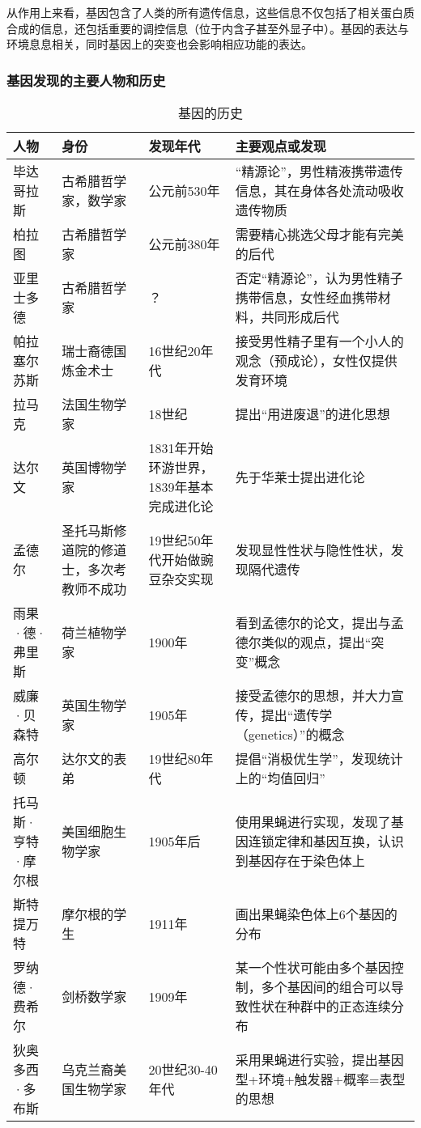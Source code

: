 从作用上来看，基因包含了人类的所有遗传信息，这些信息不仅包括了相关蛋白质合成的信息，还包括重要的调控信息（位于内含子甚至外显子中）。基因的表达与环境息息相关，同时基因上的突变也会影响相应功能的表达。

\subsubsection{基因发现的主要人物和历史}
\begin{longtable}{p{}|p{}|p{}|p{}}
\caption{基因的历史}\\
\hline
人物 & 身份 & 发现年代 & 主要观点或发现 \\
\hline
\endhead
毕达哥拉斯 & 古希腊哲学家，数学家 & 公元前530年 & “精源论”，男性精液携带遗传信息，其在身体各处流动吸收遗传物质 \\
柏拉图 & 古希腊哲学家 & 公元前380年 & 需要精心挑选父母才能有完美的后代 \\
亚里士多德 & 古希腊哲学家 & ？ & 否定“精源论”，认为男性精子携带信息，女性经血携带材料，共同形成后代 \\
帕拉塞尔苏斯 & 瑞士裔德国炼金术士 & 16世纪20年代 & 接受男性精子里有一个小人的观念（预成论），女性仅提供发育环境 \\
拉马克 & 法国生物学家 & 18世纪 & 提出“用进废退”的进化思想 \\
达尔文 & 英国博物学家 & 1831年开始环游世界，1839年基本完成进化论 & 先于华莱士提出进化论 \\
孟德尔 & 圣托马斯修道院的修道士，多次考教师不成功 & 19世纪50年代开始做豌豆杂交实现 & 发现显性性状与隐性性状，发现隔代遗传 \\
雨果·德·弗里斯 & 荷兰植物学家 & 1900年 & 看到孟德尔的论文，提出与孟德尔类似的观点，提出“突变”概念 \\
威廉·贝森特 & 英国生物学家 & 1905年 & 接受孟德尔的思想，并大力宣传，提出“遗传学（genetics）”的概念 \\
高尔顿 & 达尔文的表弟 & 19世纪80年代 & 提倡“消极优生学”，发现统计上的“均值回归” \\
托马斯·亨特·摩尔根 & 美国细胞生物学家 & 1905年后 & 使用果蝇进行实现，发现了基因连锁定律和基因互换，认识到基因存在于染色体上 \\
斯特提万特 & 摩尔根的学生 & 1911年 & 画出果蝇染色体上6个基因的分布 \\
罗纳德·费希尔 & 剑桥数学家 & 1909年 & 某一个性状可能由多个基因控制，多个基因间的组合可以导致性状在种群中的正态连续分布 \\
狄奥多西·多布斯 & 乌克兰裔美国生物学家 & 20世纪30-40年代 & 采用果蝇进行实验，提出基因型+环境+触发器+概率=表型的思想 \\

\end{longtable}
